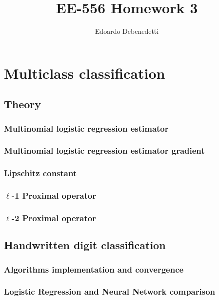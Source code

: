 \documentclass[12pt]{article}
\title{EE-556 Homework 3}
\author{Edoardo Debenedetti}
\begin{document}
\maketitle

\section{Multiclass classification}

\subsection{Theory}

\subsubsection{Multinomial logistic regression estimator}

\subsubsection{Multinomial logistic regression estimator gradient}

\subsubsection{Lipschitz constant}

\subsubsection{\texorpdfstring{$\ell$}{Lg}-1 Proximal operator}

\subsubsection{\texorpdfstring{$\ell$}{Lg}-2 Proximal operator}

\subsection{Handwritten digit classification}

\subsubsection{Algorithms implementation and convergence}

\subsubsection{Logistic Regression and Neural Network comparison}
\end{document}
